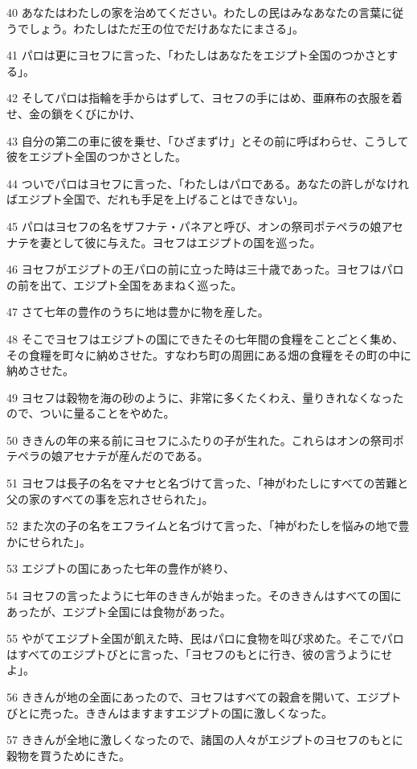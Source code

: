 \par 40 あなたはわたしの家を治めてください。わたしの民はみなあなたの言葉に従うでしょう。わたしはただ王の位でだけあなたにまさる」。
\par 41 パロは更にヨセフに言った、「わたしはあなたをエジプト全国のつかさとする」。
\par 42 そしてパロは指輪を手からはずして、ヨセフの手にはめ、亜麻布の衣服を着せ、金の鎖をくびにかけ、
\par 43 自分の第二の車に彼を乗せ、「ひざまずけ」とその前に呼ばわらせ、こうして彼をエジプト全国のつかさとした。
\par 44 ついでパロはヨセフに言った、「わたしはパロである。あなたの許しがなければエジプト全国で、だれも手足を上げることはできない」。
\par 45 パロはヨセフの名をザフナテ・パネアと呼び、オンの祭司ポテペラの娘アセナテを妻として彼に与えた。ヨセフはエジプトの国を巡った。
\par 46 ヨセフがエジプトの王パロの前に立った時は三十歳であった。ヨセフはパロの前を出て、エジプト全国をあまねく巡った。
\par 47 さて七年の豊作のうちに地は豊かに物を産した。
\par 48 そこでヨセフはエジプトの国にできたその七年間の食糧をことごとく集め、その食糧を町々に納めさせた。すなわち町の周囲にある畑の食糧をその町の中に納めさせた。
\par 49 ヨセフは穀物を海の砂のように、非常に多くたくわえ、量りきれなくなったので、ついに量ることをやめた。
\par 50 ききんの年の来る前にヨセフにふたりの子が生れた。これらはオンの祭司ポテペラの娘アセナテが産んだのである。
\par 51 ヨセフは長子の名をマナセと名づけて言った、「神がわたしにすべての苦難と父の家のすべての事を忘れさせられた」。
\par 52 また次の子の名をエフライムと名づけて言った、「神がわたしを悩みの地で豊かにせられた」。
\par 53 エジプトの国にあった七年の豊作が終り、
\par 54 ヨセフの言ったように七年のききんが始まった。そのききんはすべての国にあったが、エジプト全国には食物があった。
\par 55 やがてエジプト全国が飢えた時、民はパロに食物を叫び求めた。そこでパロはすべてのエジプトびとに言った、「ヨセフのもとに行き、彼の言うようにせよ」。
\par 56 ききんが地の全面にあったので、ヨセフはすべての穀倉を開いて、エジプトびとに売った。ききんはますますエジプトの国に激しくなった。
\par 57 ききんが全地に激しくなったので、諸国の人々がエジプトのヨセフのもとに穀物を買うためにきた。

